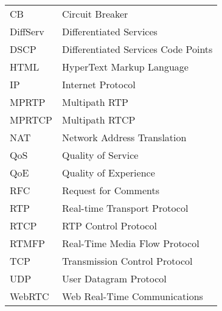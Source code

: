 \begin{longtable}{ll}
CB		& Circuit Breaker \\
DiffServ	& Differentiated Services \\
DSCP 	& Differentiated Services Code Points \\
HTML	& HyperText Markup Language \\
IP		& Internet Protocol \\
MPRTP 	& Multipath RTP \\
MPRTCP 	& Multipath RTCP \\
NAT		& Network Address Translation \\
QoS		& Quality of Service \\
QoE		& Quality of Experience \\
RFC 	& Request for Comments \\
RTP 	& Real-time Transport Protocol \\
RTCP 	& RTP Control Protocol \\
RTMFP	& Real-Time Media Flow Protocol \\
TCP		& Transmission Control Protocol \\
UDP		& User Datagram Protocol \\
WebRTC 	& Web Real-Time Communications \\
\end{longtable}
